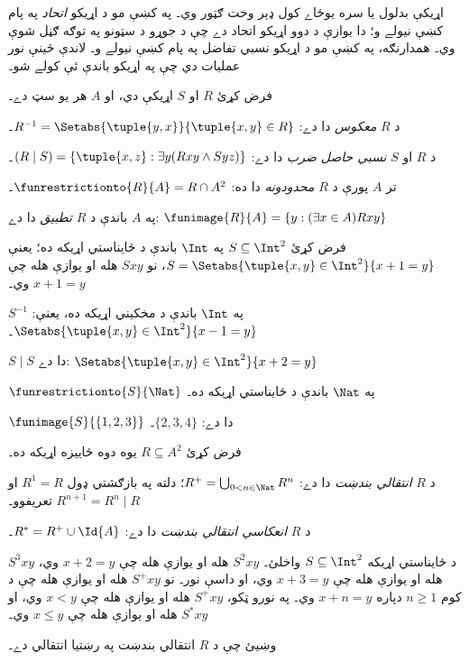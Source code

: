 \documentclass[../../../include/open-logic-section]{subfiles}
\begin{document}

اړيکې بدلول يا سره يوځاے کول ډېر وخت ګټور وي۔ په
 کښې مو د اړيکو
\emph{اتحاد} په پام کښې نيولے و؛ دا يوازې د دوو اړيکو اتحاد دے
چې د جوړو د سټونو په توګه ګڼل شوې وي۔ همدارنګه، په
 کښې مو د اړيکو نسبي
تفاضل په پام کښې نيولے و۔ لاندې ځينې نور عمليات دي چې په اړيکو
باندې ئې کولے شو۔

\begin{defn}
فرض کړئ $R$ او $S$ اړيکې دي، او $A$ هر يو سټ دے۔

د $R$ \emph{معکوس} دا دے:
$R^{-1} = \Setabs{\tuple{y, x}}{\tuple{x, y} \in R}$۔

د $R$ او $S$ \emph{نسبي حاصل ضرب} دا دے:
$(R \mid S) = \{\tuple{x, z} : \exists y(Rxy \land Syz)\}$۔

تر $A$ پورې د $R$ \emph{محدودونه} دا ده:
$\funrestrictionto{R}{A}= R \cap A^2$۔

په $A$ باندې د $R$ \emph{تطبيق} دا دے:
$\funimage{R}{A} = \{y : (\exists x \in A)Rxy\}$
\end{defn}

\begin{ex}
فرض کړئ $S \subseteq \Int^2$ په $\Int$ باندې د ځايناستي اړيکه
ده؛ يعنې $S = \Setabs{\tuple{x, y} \in \Int^2}{x + 1 = y}$،
نو $Sxy$ هله او يوازې هله چې $x + 1 = y$ وي۔

$S^{-1}$ په $\Int$ باندې د مخکيني اړيکه ده، يعنې:
$\Setabs{\tuple{x,y}\in\Int^2}{x -1 =y}$۔

$S\mid S$ دا دے:
$ \Setabs{\tuple{x,y}\in\Int^2}{x + 2 =y}$

$\funrestrictionto{S}{\Nat}$ په $\Nat$ باندې د ځايناستي اړيکه ده۔

$\funimage{S}{\{1,2,3\}}$ دا دے: $\{2, 3, 4\}$۔
\end{ex}

\begin{defn}فرض کړئ $R \subseteq A^2$ يوه دوه ځاييزه اړيکه ده۔

د $R$ \emph{انتقالي بندښت} دا دے:
$R^+ = \bigcup_{0 < n \in \Nat} R^n$؛ دلته په بازګشتي ډول
$R^1 = R$ او $R^{n+1} = R^n \mid R$ تعريفوو۔

د $R$ \emph{انعکاسي انتقالي بندښت} دا دے:
$R^* = R^+ \cup \Id{A}$۔
\end{defn}

\begin{ex}
د ځايناستي اړيکه $S \subseteq \Int^2$ واخلئ۔ $S^2xy$ هله او
يوازې هله چې $x + 2 = y$ وي، $S^3xy$ هله او يوازې هله چې
$x + 3 = y$ وي، او داسې نور۔ نو $S^+xy$ هله او يوازې هله چې
د کوم $n \geq 1$ دپاره $x + n = y$ وي۔ په نورو ټکو، $S^+xy$
هله او يوازې هله چې $x < y$ وي، او $S^*xy$ هله او يوازې هله چې
$x \le y$ وي۔
\end{ex}

\begin{prob}
وښيئ چې د $R$ انتقالي بندښت په رښتيا انتقالي دے۔
\end{prob}
\end{document}
